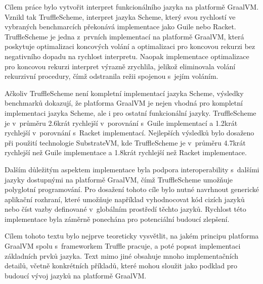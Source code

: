 \documentclass[
  master,
  biblatex,
  figures=true,
  theorems,
  sourcecodes,
  glossaries,
  index
]{kidiplom}
\begin{document}
\begin{kiconclusions}
Cílem práce bylo vytvořit interpret funkcionálního jazyka na platformě GraalVM. Vznikl tak TruffleScheme, interpret jazyka Scheme, který svou rychlostí ve vybraných benchmarcích překonává implementace jako Guile nebo Racket. TruffleScheme je jedna z~prvních implementací na platformě GraalVM, která poskytuje optimalizaci koncových volání a optimalizaci pro koncovou rekurzi bez negativního dopadu na rychlost interpretu. Naopak implementace optimalizace pro koncovou rekurzi interpret výrazně zrychlila, jelikož eliminovala volání rekurzivní procedury, čímž odstranila režii spojenou s~jejím voláním. 

Ačkoliv TruffleScheme není kompletní implementací jazyka Scheme, výsledky benchmarků dokazují, že platforma GraalVM je nejen vhodná pro kompletní implementaci jazyka Scheme, ale i pro ostatní funkcionální jazyky. TruffleScheme je v~průměru 2.6krát rychlejší v~porovnání s~Guile implementací a 1.2krát rychlejší v~porovnání s~Racket implementací. Nejlepších výsledků bylo dosaženo při použití technologie SubstrateVM, kde TruffleScheme je v~průměru 4.7krát rychlejší než Guile implementace a 1.8krát rychlejší než Racket implementace. 


Dalším důležitým aspektem implementace byla podpora interoperability s~dalšími jazyky dostupnými na platformě GraalVM, čímž TruffleScheme umožňuje polyglotní programování. Pro dosažení tohoto cíle bylo nutné navrhnout generické aplikační rozhraní, které umožňuje například vyhodnocovat kód cizích jazyků nebo číst vazby definované v~globálním prostředí těchto jazyků. Rychlost této implementace byla záměrně ponechána pro potenciální budoucí zlepšení. 

Cílem tohoto textu bylo nejprve teoreticky vysvětlit, na jakém principu platforma GraalVM spolu s~frameworkem Truffle pracuje, a poté popsat implementaci základních prvků jazyka. Text mimo jiné obsahuje mnoho implementačních detailů, včetně konkrétních příkladů, které mohou sloužit jako podklad pro budoucí vývoj jazyků na platformě GraalVM. 
\end{kiconclusions}
\end{document}
